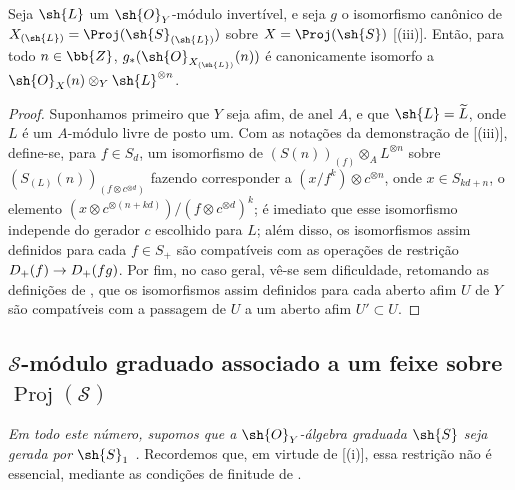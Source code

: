 \documentclass[oneside,10pt]{amsart}
\makeatletter
\newcommand{\ega@arrow}[2]{\mathchoice{#1}{#2}{#2}{#2}}
\renewcommand{\to}{\ega@arrow{\longrightarrow}{\rightarrow}}
\let\EGAOriginalLabel\label
\renewcommand{\label}[1]{\phantomsection\EGAOriginalLabel{#1}}
\makeatother
\begin{document}
\begin{proposition}[3.2.10]
\label{II.3.2.10}
Seja $\sh{L}$ um $\sh{O}_Y$-módulo invertível, e seja $g$ o isomorfismo canônico de $X_{(\sh{L})}=\Proj(\sh{S}_{(\sh{L})})$ sobre $X=\Proj(\sh{S})$ [(iii)].
Então, para todo $n\in\bb{Z}$, $g_*(\sh{O}_{X_{(\sh{L})}}(n))$ é canonicamente isomorfo a $\sh{O}_X(n)\otimes_Y\sh{L}^{\otimes n}$.
\end{proposition}

\begin{proof}
Suponhamos primeiro que $Y$ seja afim, de anel $A$, e que $\sh{L}=\widetilde{L}$, onde $L$ é um $A$-módulo livre de posto um.
Com as notações da demonstração de [(iii)], define-se, para $f\in S_d$, um isomorfismo de $(S(n))_{(f)}\otimes_A L^{\otimes n}$ sobre $(S_{(L)}(n))_{(f\otimes c^{\otimes d})}$ fazendo corresponder a $(x/f^k)\otimes c^{\otimes n}$, onde $x\in S_{kd+n}$, o elemento $(x\otimes c^{\otimes(n+kd)})/(f\otimes c^{\otimes d})^k$;
é imediato que esse isomorfismo independe do gerador $c$ escolhido para $L$;
além disso, os isomorfismos assim definidos para cada $f\in S_+$ são compatíveis com as operações de restrição $D_+(f)\to D_+(fg)$.
Por fim, no caso geral, vê-se sem dificuldade, retomando as definições de , que os isomorfismos assim definidos para cada aberto afim $U$ de $Y$ são compatíveis com a passagem de $U$ a um aberto afim $U'\subset U$.
\end{proof}

\subsection{$\mathcal{S}$-módulo graduado associado a um feixe sobre $\operatorname{Proj}(\mathcal{S})$}
\label{subsection:II.3.3}

\emph{Em todo este número, supomos que a $\sh{O}_Y$-álgebra graduada $\sh{S}$ seja gerada por $\sh{S}_1$ .}
Recordemos que, em virtude de [(i)], essa restrição não é essencial, mediante as condições de finitude de .
\end{document}
